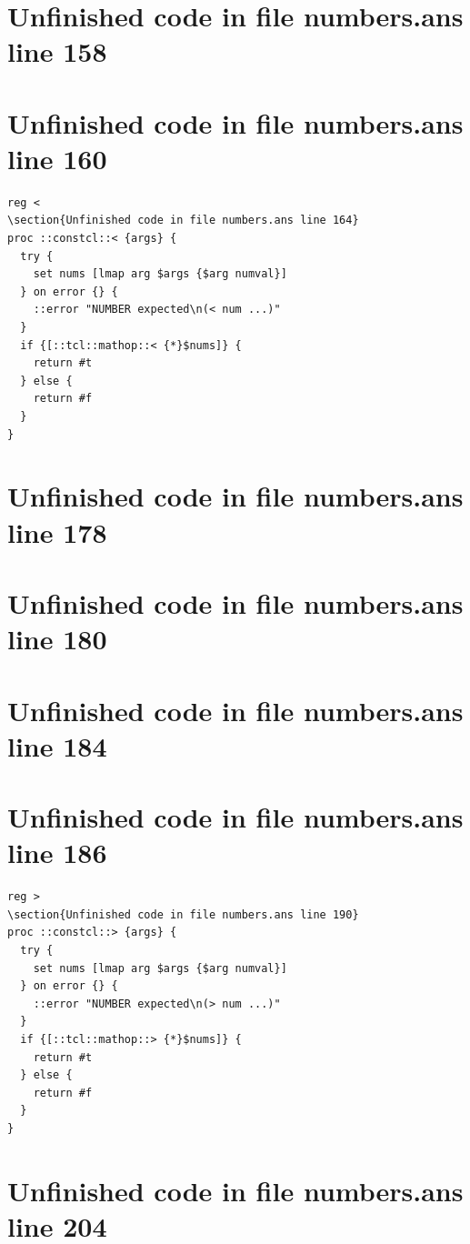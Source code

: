 \documentclass[twoside,9pt]{report}
\begin{document}
\section{Unfinished code in file numbers.ans line 158}
\section{Unfinished code in file numbers.ans line 160}
\index{<}
\begin{lstlisting}
reg <
\section{Unfinished code in file numbers.ans line 164}
proc ::constcl::< {args} {
  try {
    set nums [lmap arg $args {$arg numval}]
  } on error {} {
    ::error "NUMBER expected\n(< num ...)"
  }
  if {[::tcl::mathop::< {*}$nums]} {
    return #t
  } else {
    return #f
  }
}
\end{lstlisting}
\section{Unfinished code in file numbers.ans line 178}
\section{Unfinished code in file numbers.ans line 180}
\section{Unfinished code in file numbers.ans line 184}
\section{Unfinished code in file numbers.ans line 186}
\index{>}
\begin{lstlisting}
reg >
\section{Unfinished code in file numbers.ans line 190}
proc ::constcl::> {args} {
  try {
    set nums [lmap arg $args {$arg numval}]
  } on error {} {
    ::error "NUMBER expected\n(> num ...)"
  }
  if {[::tcl::mathop::> {*}$nums]} {
    return #t
  } else {
    return #f
  }
}
\end{lstlisting}
\section{Unfinished code in file numbers.ans line 204}
\end{document}
